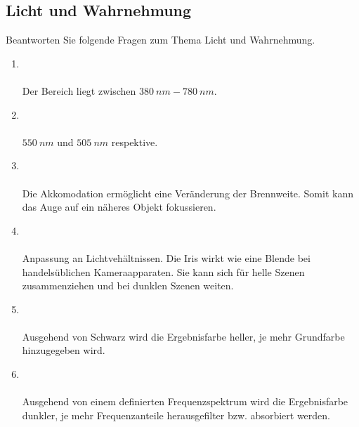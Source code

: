 \subsection{Licht und Wahrnehmung}
Beantworten Sie folgende Fragen zum Thema Licht und Wahrnehmung.
\begin{enumerate}
    \item   {}\\\\
            Der Bereich liegt zwischen $\SI{380}{nm}-\SI{780}{nm}$.

    \item   {}\\\\
            $\SI{550}{nm}$ und $\SI{505}{nm}$ respektive.

    \item   {}\\\\
            Die Akkomodation ermöglicht eine Veränderung der Brennweite. Somit kann das Auge auf ein
            näheres Objekt fokussieren.

    \item   {}\\\\
            Anpassung an Lichtvehältnissen. Die Iris wirkt wie eine Blende bei handelsüblichen Kameraapparaten. Sie kann sich für helle Szenen 
            zusammenziehen und bei dunklen Szenen weiten.
    \clearpage
    \item   {}\\\\
            Ausgehend von Schwarz wird die Ergebnisfarbe heller, je mehr Grundfarbe hinzugegeben wird.
    \item   {}\\\\
            Ausgehend von einem definierten Frequenzspektrum wird die Ergebnisfarbe dunkler, je mehr Frequenzanteile herausgefilter bzw. absorbiert werden.


\end{enumerate}

